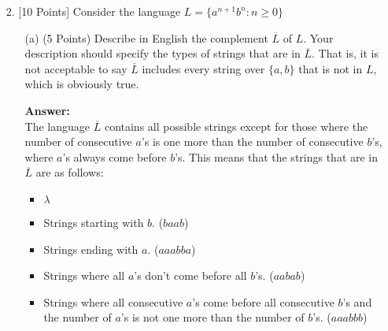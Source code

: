 \documentclass[12pt]{article}
\begin{document}
\begin{spacing}{1.5}
\begin{enumerate}
\begin{enumerate}
                              \newpage
                        \item[(d)] (5 Points) $L_d = \{w \in \{a,b\}^* : w \neq xx, \text{ for any } x \in \{a,b\}^* \}$

                              $S \rightarrow X | Y$ \\
                              $X \rightarrow aXa | bXb | aXb | bXa | a | b$ \\
                              $Y \rightarrow aYa | bYb | aYb | bYa | aY_1a | bY_2b | aY_3b | bY_4a$ \\
                              $Y_1 \rightarrow bZb | aZb | bZa$ \\
                              $Y_2 \rightarrow aZa | aZb | bZa$ \\
                              $Y_3 \rightarrow aZa | bZb | aZb$ \\
                              $Y_4 \rightarrow aZa | bZb | bZa$ \\
                              $Z \rightarrow aZa | bZb | aZb | bZa | \lambda$

                  \end{enumerate}

                  \newpage
            \item[2.] [10 Points] Consider the language $L=\{a^{n+1}b^n : n \geq 0 \}$

                  \begin{enumerate}
                        \item[(a)] (5 Points) Describe in English the complement $\overline{L}$ of $L$. Your description should specify the types of strings that are in $\overline{L}$. That is, it is not acceptable to say $\overline{L}$ includes every string over $\{a,b \}$ that is not in $L$, which is obviously true.

                              \textbf{Answer:} \\
                              The language $\overline{L}$ contains all possible strings except for those where the number of consecutive $a$'s is one more than the number of consecutive $b$'s, where $a$'s always come before $b$'s. This means that the strings that are in $\overline{L}$ are as follows:
                              \begin{itemize}
                                    \item $\lambda$
                                    \item Strings starting with $b$. ($baab$)
                                    \item Strings ending with $a$. ($aaabba$)
                                    \item Strings where all $a$'s don't come before all $b$'s. ($aabab$)
                                    \item Strings where all consecutive $a$'s come before all consecutive $b$'s and the number of $a$'s is not one more than the number of $b$'s. ($aaabbb$)
                              \end{itemize}


\end{enumerate}
\end{enumerate}
\end{spacing}
\end{document}
